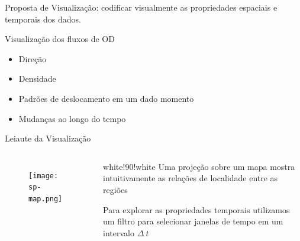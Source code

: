 \begin{frame}[standout]
  Proposta de Visualização: codificar visualmente as propriedades espaciais
e temporais dos dados.
\end{frame}

\begin{frame}{Visualização dos fluxos de OD}
  \begin{itemize}
    \item Direção
    \item Densidade
    \item Padrões de deslocamento em um dado momento
    \item Mudanças ao longo do tempo
  \end{itemize}
\end{frame}

\begin{frame}{Leiaute da Visualização}
  \begin{columns}[t]
    \col
		\begin{figure}[ht!]
			\centering
			\texttt{[image: sp-map.png]}
		\end{figure}

    \col
		\begin{coloredblock}{white!90!white}{}
		Uma projeção sobre um mapa mostra intuitivamente as relações de localidade entre
		as regiões

    \pause
    Para explorar as propriedades temporais  utilizamos um filtro para selecionar
    janelas de tempo em um intervalo $\Delta~t$ 
		\end{coloredblock}
  \end{columns}
\end{frame}


